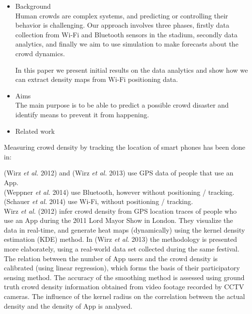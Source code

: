 \documentclass[10pt,a4paper]{article}
\begin{document}
\begin{itemize}

\item Background\\

Human crowds are complex systems, and predicting or controlling their behavior is challenging. Our approach involves three phases, firstly data collection from Wi-Fi and Bluetooth sensors in the stadium, secondly data analytics, and finally we aim to use simulation to make forecasts about the crowd dynamics. 

In this paper we present initial results on the data analytics and show how we can extract density maps from Wi-Fi positioning data. 

\item Aims\\

The main purpose is to be able to predict a possible crowd disaster and identify means to prevent it from happening. 

\item Related work\\

\end{itemize}

Measuring crowd density by tracking the location of smart phones has been done in:

(Wirz \textit{et al.} 2012) \cite{wirz:1} and (Wirz \textit{et al.} 2013) \cite{wirz:2} use GPS data of people that use an App.\\
(Weppner \textit{et al.} 2014) \cite{weppner:1} use Bluetooth, however without positioning / tracking.\\
(Schauer \textit{et al.} 2014) \cite{schauer:1} use Wi-Fi, without positioning / tracking.\\

Wirz \textit{et al.} (2012) \cite{wirz:1} infer crowd density from GPS location traces of people who use an App during the 2011 Lord Mayor Show in London. They visualize the data in real-time, and generate heat maps (dynamically) using the kernel density estimation (KDE) method. In (Wirz \textit{et al.} 2013) \cite{wirz:2} the methodology is presented more elaborately, using a real-world data set collected during the same festival. The relation between the number of App users and the crowd density is calibrated (using linear regression), which forms the basis of their participatory sensing method. 
The accuracy of the smoothing method is assessed using ground truth crowd density information obtained from video footage recorded by CCTV cameras. 
The influence of the kernel radius on the correlation between the actual density and the density of App is analysed.
\end{document}
